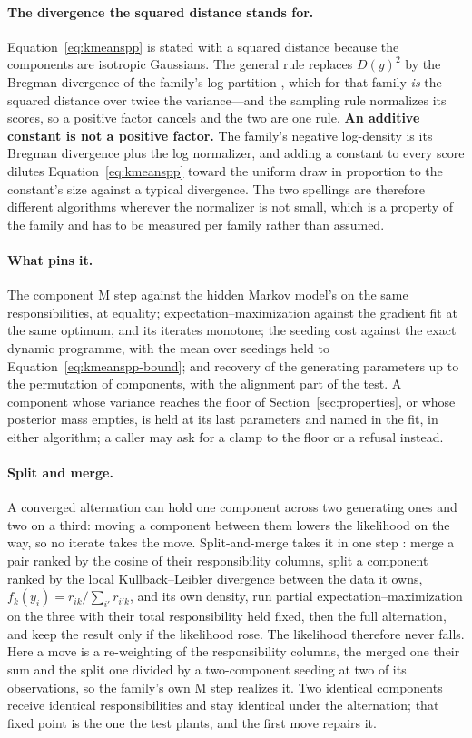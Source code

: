 \documentclass[11pt,a4paper]{article}
\begin{document}
\paragraph{The divergence the squared distance stands for.}
Equation~\ref{eq:kmeanspp} is stated with a squared distance because the
components are isotropic Gaussians. The general rule replaces $D(y)^2$ by the
Bregman divergence of the family's log-partition \citep{banerjee2005}, which
for that family \emph{is} the squared distance over twice the variance---and
the sampling rule normalizes its scores, so a positive factor cancels and the
two are one rule. \textbf{An additive constant is not a positive factor.} The
family's negative log-density is its Bregman divergence plus the log
normalizer, and adding a constant to every score dilutes
Equation~\ref{eq:kmeanspp} toward the uniform draw in proportion to the
constant's size against a typical divergence. The two spellings are therefore
different algorithms wherever the normalizer is not small, which is a property
of the family and has to be measured per family rather than assumed.

\paragraph{What pins it.}
The component M step against the hidden Markov model's on the same
responsibilities, at equality; expectation--maximization against the
gradient fit at the same optimum, and its iterates monotone; the seeding cost
against the exact dynamic programme, with the mean over seedings held to
Equation~\ref{eq:kmeanspp-bound}; and recovery of the generating parameters
up to the permutation of components, with the alignment part of the test. A
component whose variance reaches the floor of Section~\ref{sec:properties},
or whose posterior mass empties, is held at its last parameters and named in
the fit, in either algorithm; a caller may ask for a clamp to the floor or a
refusal instead.

\paragraph{Split and merge.}
A converged alternation can hold one component across two generating ones and
two on a third: moving a component between them lowers the likelihood on the
way, so no iterate takes the move. Split-and-merge takes it in one step
\citep{ueda2000}: merge a pair ranked by the cosine of their responsibility
columns, split a component ranked by the local Kullback--Leibler divergence
between the data it owns, $f_k(y_i) = r_{ik} / \sum_{i'} r_{i'k}$, and its own
density, run partial expectation--maximization on the three with their total
responsibility held fixed, then the full alternation, and keep the result only
if the likelihood rose. The likelihood therefore never falls. Here a move is
a re-weighting of the responsibility columns, the merged one their sum and the
split one divided by a two-component seeding at two of its observations, so
the family's own M step realizes it. Two identical components receive
identical responsibilities and stay identical under the alternation; that
fixed point is the one the test plants, and the first move repairs it.
\end{document}
